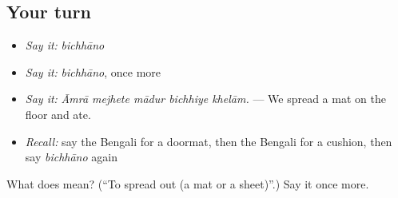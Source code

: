 \subsection*{Your turn}
\begin{itemize}
\raggedright
  \item \emph{Say it:} \emph{bichhāno}
  \item \emph{Say it:} \emph{bichhāno}, once more
  \item \emph{Say it:} \emph{Āmrā mejhete mādur bichhiye khelām.} — We spread a mat on the floor and ate.
  \item \emph{Recall:} say the Bengali for a doormat, then the Bengali for a cushion, then say \emph{bichhāno} again
\end{itemize}

\begin{tcolorbox}[breakable,colback=teal!4,colframe=teal!35!black,title={Before you move on}]
What does  mean? (\textquotedblleft{}To spread out (a mat or a sheet)\textquotedblright{}.) Say it once more.
\end{tcolorbox}

